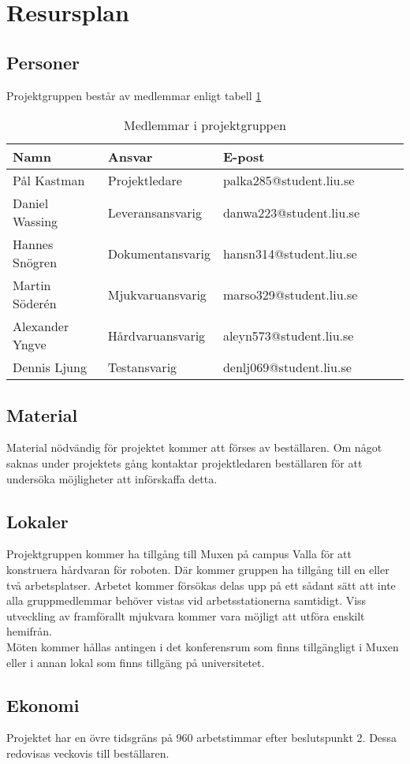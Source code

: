 \section{Resursplan}

\subsection{Personer}
Projektgruppen består av medlemmar enligt tabell \ref{projektplan:resursplan-personer}
\begin{table}[h]
	\centering
		\begin{tabularx}{\textwidth}{| l | l | X | l | l | l |}
			\hline
			\textbf{Namn} & \textbf{Ansvar} & \textbf{E-post} \\
			\hline
			{Pål Kastman} & {Projektledare} & {palka285@student.liu.se} \\\hline
			{Daniel Wassing} & {Leveransansvarig} & {danwa223@student.liu.se} \\\hline
			{Hannes Snögren} & {Dokumentansvarig} & {hansn314@student.liu.se} \\\hline
			{Martin Söderén} & {Mjukvaruansvarig} & {marso329@student.liu.se} \\\hline
			{Alexander Yngve} & {Hårdvaruansvarig} & {aleyn573@student.liu.se} \\\hline
			{Dennis Ljung} & {Testansvarig} & {denlj069@student.liu.se} \\\hline
		\end{tabularx}
	\caption{Medlemmar i projektgruppen} \label{projektplan:resursplan-personer}
\end{table}

\subsection{Material}
Material nödvändig för projektet kommer att förses av beställaren. Om något saknas under projektets gång kontaktar projektledaren beställaren för att undersöka möjligheter att införskaffa detta.

\subsection{Lokaler}
Projektgruppen kommer ha tillgång till Muxen på campus Valla för att konstruera hårdvaran för roboten. Där kommer gruppen ha tillgång till en eller två arbetsplatser. Arbetet kommer försökas delas upp på ett sådant sätt att inte alla gruppmedlemmar behöver vistas vid arbetsstationerna samtidigt. Viss utveckling av framförallt mjukvara kommer vara möjligt att utföra enskilt hemifrån. \\
Möten kommer hållas antingen i det konferensrum som finns tillgängligt i Muxen eller i annan lokal som finns tillgäng på universitetet.

\subsection{Ekonomi}
Projektet har en övre tidsgräns på 960 arbetstimmar efter beslutspunkt 2. Dessa redovisas veckovis till beställaren.